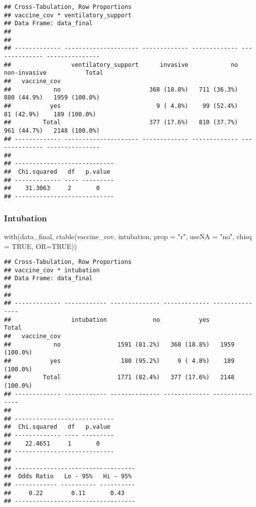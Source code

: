 \documentclass[
]{article}
\newenvironment{Shaded}{\begin{snugshade}}{\end{snugshade}}
\newcommand{\AttributeTok}[1]{\textcolor[rgb]{0.77,0.63,0.00}{#1}}
\newcommand{\ConstantTok}[1]{\textcolor[rgb]{0.00,0.00,0.00}{#1}}
\newcommand{\FunctionTok}[1]{\textcolor[rgb]{0.00,0.00,0.00}{#1}}
\newcommand{\NormalTok}[1]{#1}
\newcommand{\StringTok}[1]{\textcolor[rgb]{0.31,0.60,0.02}{#1}}
\begin{document}
\begin{verbatim}
## Cross-Tabulation, Row Proportions  
## vaccine_cov * ventilatory_support  
## Data Frame: data_final  
## 
## 
## ------------- --------------------- ------------- ------------- -------------- ---------------
##                 ventilatory_support      invasive            no   non-invasive           Total
##   vaccine_cov                                                                                 
##            no                         368 (18.8%)   711 (36.3%)    880 (44.9%)   1959 (100.0%)
##           yes                           9 ( 4.8%)    99 (52.4%)     81 (42.9%)    189 (100.0%)
##         Total                         377 (17.6%)   810 (37.7%)    961 (44.7%)   2148 (100.0%)
## ------------- --------------------- ------------- ------------- -------------- ---------------
## 
## ----------------------------
##  Chi.squared   df   p.value 
## ------------- ---- ---------
##    31.3063     2       0    
## ----------------------------
\end{verbatim}

\hypertarget{intubation}{%
\subsubsection{Intubation}\label{intubation}}

\begin{Shaded}
\begin{Highlighting}[]
\FunctionTok{with}\NormalTok{(data\_final, }\FunctionTok{ctable}\NormalTok{(vaccine\_cov, intubation, }\AttributeTok{prop =} \StringTok{"r"}\NormalTok{, }\AttributeTok{useNA =} \StringTok{"no"}\NormalTok{, }\AttributeTok{chisq =} \ConstantTok{TRUE}\NormalTok{, }\AttributeTok{OR=}\ConstantTok{TRUE}\NormalTok{))}
\end{Highlighting}
\end{Shaded}

\begin{verbatim}
## Cross-Tabulation, Row Proportions  
## vaccine_cov * intubation  
## Data Frame: data_final  
## 
## 
## ------------- ------------ -------------- ------------- ---------------
##                 intubation             no           yes           Total
##   vaccine_cov                                                          
##            no                1591 (81.2%)   368 (18.8%)   1959 (100.0%)
##           yes                 180 (95.2%)     9 ( 4.8%)    189 (100.0%)
##         Total                1771 (82.4%)   377 (17.6%)   2148 (100.0%)
## ------------- ------------ -------------- ------------- ---------------
## 
## ----------------------------
##  Chi.squared   df   p.value 
## ------------- ---- ---------
##    22.4651     1       0    
## ----------------------------
## 
## ----------------------------------
##  Odds Ratio   Lo - 95%   Hi - 95% 
## ------------ ---------- ----------
##     0.22        0.11       0.43   
## ----------------------------------
\end{verbatim}
\end{document}
